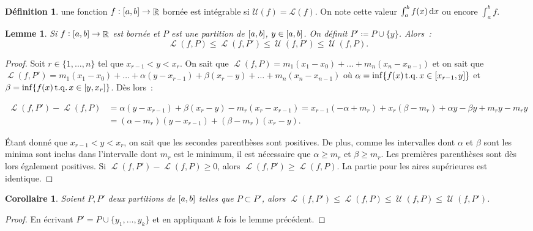 \documentclass{article}
\DeclareMathOperator{\R}{\mathbb R}
\DeclareMathOperator{\tq}{ t.q. }
\DeclareMathOperator{\Larea}{\mathcal L}
\DeclareMathOperator{\Uarea}{\mathcal U}
\newcommand{\ab}{\interval ab}
\newcommand{\fabr}[1]{#1 : \ab \to \R}
\newtheorem{cor}[thm]{Corollaire}
\newtheorem{lem}[thm]{Lemme}
\theoremstyle{definition}
\newtheorem{déf}[thm]{Définition}
\theoremstyle{remark}
\begin{document}
		\begin{déf} une fonction $\fabr f$ bornée est intégrable si $\mathcal U(f) = \mathcal L(f)$. On note cette valeur $\int_a^bf(x)\dif x$ ou encore
		$\int_a^b f$. \end{déf}

		\begin{lem} Si $\fabr f$ est bornée et $P$ est une partition de $\ab$, $y \in \ab$. On définit $P' \coloneqq P \cup \{y\}$. Alors~:
		\[\Larea(f, P) \leq \Larea(f, P') \leq \Uarea(f, P') \leq \Uarea(f, P).\]
		\end{lem}

		\begin{proof} Soit $r \in \{1, \ldots, n\}$ tel que $x_{r-1} < y < x_r$. On sait que $\Larea(f, P) = m_1(x_1-x_0) + \ldots + m_n(x_n-x_{n-1})$ et on
		sait que $\Larea(f, P') = m_1(x_1-x_0) + \ldots + \alpha(y-x_{r-1}) + \beta(x_r-y) + \ldots + m_n(x_n-x_{n-1})$ où
		$\alpha = \inf \{f(x) \tq x \in \interval {x_{r-1}}y\}$ et $\beta = \inf \{f(x) \tq x \in \interval y{x_r}\}$. Dès lors~:

		\begin{align*}
			\Larea(f, P')-\Larea(f, P) &= \alpha(y-x_{r-1}) + \beta(x_r-y) - m_r(x_r-x_{r-1}) = x_{r-1}(-\alpha+m_r)+ x_r(\beta-m_r) + \alpha y - \beta y + m_ry - m_ry \\
			                           &= (\alpha-m_r)(y-x_{r-1}) + (\beta-m_r)(x_r-y).
		\end{align*}

		Étant donné que $x_{r-1} < y < x_r$, on sait que les secondes parenthèses sont positives. De plus, comme les intervalles dont $\alpha$ et $\beta$ sont
		les minima sont inclus dans l'intervalle dont $m_r$ est le minimum, il est nécessaire que $\alpha \geq m_r$ et $\beta \geq m_r$. Les premières
		parenthèses sont dès lors également positives. Si $\Larea(f, P')-\Larea(f, P) \geq 0$, alors $\Larea(f, P') \geq \Larea(f, P)$. La partie pour les aires
		supérieures est identique. \end{proof}

		\begin{cor} Soient $P, P'$ deux partitions de $\ab$ telles que $P \subset P'$, alors $\Larea(f, P') \leq \Larea(f, P) \leq \Uarea(f, P) \leq \Uarea(f, P')$.
		\end{cor}

		\begin{proof} En écrivant $P' = P \cup \{y_1, \ldots, y_k\}$ et en appliquant $k$ fois le lemme précédent. \end{proof}
\end{document}

